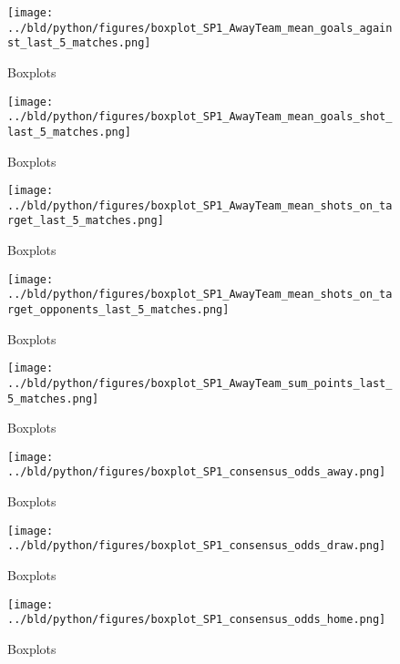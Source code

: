 \documentclass[11pt, a4paper, leqno]{article}
\begin{document}
\begin{figure}[H]
    \centering
    \texttt{[image: ../bld/python/figures/boxplot\_SP1\_AwayTeam\_mean\_goals\_against\_last\_5\_matches.png]}
    \caption{Boxplots}
    \label{fig:figure2}
\end{figure}

\begin{figure}[H]
    \centering
    \texttt{[image: ../bld/python/figures/boxplot\_SP1\_AwayTeam\_mean\_goals\_shot\_last\_5\_matches.png]}
    \caption{Boxplots}
    \label{fig:figure2}
\end{figure}

\begin{figure}[H]
    \centering
    \texttt{[image: ../bld/python/figures/boxplot\_SP1\_AwayTeam\_mean\_shots\_on\_target\_last\_5\_matches.png]}
    \caption{Boxplots}
    \label{fig:figure2}
\end{figure}

\begin{figure}[H]
    \centering
    \texttt{[image: ../bld/python/figures/boxplot\_SP1\_AwayTeam\_mean\_shots\_on\_target\_opponents\_last\_5\_matches.png]}
    \caption{Boxplots}
    \label{fig:figure2}
\end{figure}

\begin{figure}[H]
    \centering
    \texttt{[image: ../bld/python/figures/boxplot\_SP1\_AwayTeam\_sum\_points\_last\_5\_matches.png]}
    \caption{Boxplots}
    \label{fig:figure2}
\end{figure}

\begin{figure}[H]
    \centering
    \texttt{[image: ../bld/python/figures/boxplot\_SP1\_consensus\_odds\_away.png]}
    \caption{Boxplots}
    \label{fig:figure2}
\end{figure}

\begin{figure}[H]
    \centering
    \texttt{[image: ../bld/python/figures/boxplot\_SP1\_consensus\_odds\_draw.png]}
    \caption{Boxplots}
    \label{fig:figure2}
\end{figure}

\begin{figure}[H]
    \centering
    \texttt{[image: ../bld/python/figures/boxplot\_SP1\_consensus\_odds\_home.png]}
    \caption{Boxplots}
    \label{fig:figure2}
\end{figure}
\end{document}
